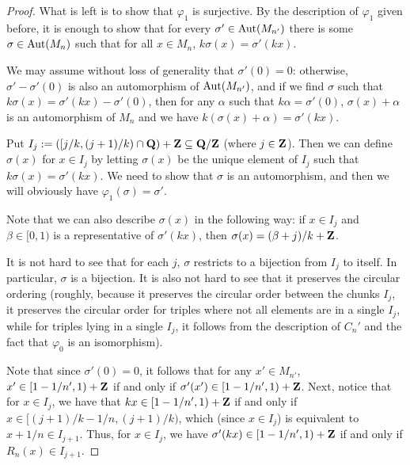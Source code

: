 \begin{proof}
		What is left is to show that $\varphi_1$ is surjective. By the description of $\varphi_1$ given before, it is enough to show that for every $\sigma'\in \operatorname{{Aut}}(M_{n'})$ there is some $\sigma\in\operatorname{{Aut}}(M_n)$ such that for all $x\in M_{n}$, $k\sigma(x)=\sigma'(kx)$.
		
		We may assume without loss of generality that $\sigma'(0)=0$: otherwise, $\sigma'-\sigma'(0)$ is also an automorphism of $\operatorname{{Aut}}(M_{n'})$, and if we find $\sigma$ such that $k\sigma(x)=\sigma'(kx)-\sigma'(0)$, then for any $\alpha$ such that $k\alpha=\sigma'(0)$, $\sigma(x)+\alpha$ is an automorphism of $M_n$ and we have $k(\sigma(x)+\alpha)=\sigma'(kx)$.
		
		Put $I_j:=([j/k,(j+1)/k)\cap {\mathbf{Q}})+{\mathbf{Z}}\subseteq {\mathbf{Q}}/{\mathbf{Z}}$ (where $j\in {\mathbf{Z}}$). Then we can define $\sigma(x)$ for $x\in I_j$ by letting $\sigma(x)$ be the unique element of $I_j$ such that $k\sigma(x)=\sigma'(kx)$. We need to show that $\sigma$ is an automorphism, and then we will obviously have $\varphi_1(\sigma)=\sigma'$.
		
		Note that we can also describe $\sigma(x)$ in the following way: if $x\in I_j$ and $\beta\in [0,1)$ is a representative of $\sigma'(kx)$, then $\sigma(x)=(\beta+j)/k+{\mathbf{Z}}$.
		
		It is not hard to see that for each $j$, $\sigma$ restricts to a bijection from $I_j$ to itself. In particular, $\sigma$ is a bijection. It is also not hard to see that it preserves the circular ordering (roughly, because it preserves the circular order between the chunks $I_j$, it preserves the circular order for triples where not all elements are in a single $I_j$, while for triples lying in a single $I_j$, it follows from the description of $C_n'$ and the fact that $\varphi_0$ is an isomorphism).
		
		Note that since $\sigma'(0)=0$, it follows that for any $x'\in M_{n'}$, $x'\in [1-1/n',1)+{\mathbf{Z}}$ if and only if $\sigma'(x')\in [1-1/n',1)+{\mathbf{Z}}$. Next, notice that for $x\in I_j$, we have that $kx\in [1-1/n',1)+{\mathbf{Z}}$ if and only if $x\in [(j+1)/k-1/n,(j+1)/k)$, which (since $x\in I_j$) is equivalent to $x+1/n\in I_{j+1}$. Thus, for $x\in I_j$, we have $\sigma'(kx)\in [1-1/n',1)+{\mathbf{Z}}$ if and only if $R_n(x)\in I_{j+1}$.
		

\end{proof}
